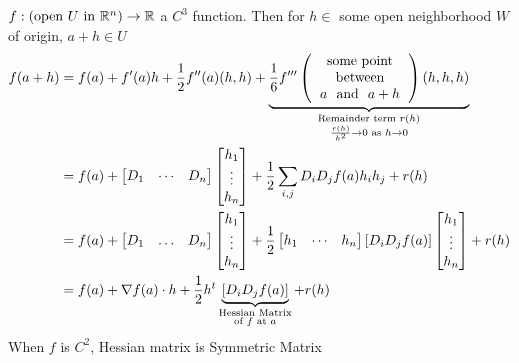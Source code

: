 $f:(\text{open }U\text{ in }\mathbb{R}^n )\to \mathbb{R}$ a $C^3$ function. Then  for $h\in $ some  open neighborhood $W$ of origin, $a+h\in U$ \begin{align*}
	f(a+h) & =f(a)+f'(a)h+\frac12f''(a)(h,h)+\underbrace{\frac16f'''\lt(\begin{tabular}{c}
		  \text{some point}    \\
		    \text{between}     \\
		$a$ \text{ and } $a+h$
	\end{tabular}\rt)(h,h,h)}_{\substack{ \text{Remainder term }r(h) \\ \frac{r(h)}{h^2}\to 0 \text{ as }h\to 0}} \\
	& = f(a)+\lt[ \begin{matrix}
		D_1 & \cdots & D_n
	\end{matrix} \rt]\lt[ \begin{matrix}
	h_1\\ \vdots \\ h_n
\end{matrix} \rt]+\frac12 \sum_{i,j}D_iD_jf(a)h_ih_j+r(h)\\
&=  f(a)+\lt[ \begin{matrix}
	D_1 & \dots & D_n
\end{matrix} \rt]\lt[ \begin{matrix}
	h_1\\ \vdots \\ h_n
\end{matrix} \rt] +\frac12 \lt[ \begin{matrix}
h_1& \cdots & h_n
\end{matrix}\rt][D_iD_jf(a)] \lt[ \begin{matrix}
h_1\\ \vdots\\ h_n
\end{matrix} \rt]+r(h)\\
&=f(a)+\nabla f(a)\cdot h+\frac12 h^t \underbrace{[D_iD_jf(a)]}_{\substack{\text{Hessian Matrix}\\ \text{of }f\text{ at }a}}+r(h)
\end{align*}
When $f$ is $C^2$, Hessian matrix is Symmetric Matrix


